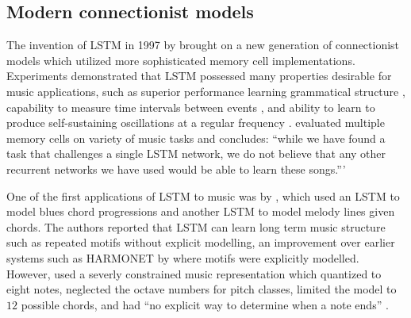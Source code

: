 \subsection{Modern connectionist models}

The invention of LSTM in 1997 by \citet{hochreiter1997long} brought on a new
generation of connectionist models which utilized more sophisticated memory
cell implementations. Experiments demonstrated that LSTM possessed many
properties desirable for music applications, such as superior performance
learning grammatical structure \citep{gers2001lstm}, capability to measure time
intervals between events \citep{gers2000recurrent}, and ability to learn to
produce self-sustaining oscillations at a regular frequency
\citet{gers2002learning}. \citet{franklin2006recurrent} evaluated multiple
memory cells on variety of music tasks and concludes: ``while we have found a
task that challenges a single LSTM network, we do not believe that any other
recurrent networks we have used would be able to learn these songs.'''

One of the first applications of LSTM to music was by
\citet{Eck2002,Eck2002-blues}, which used an LSTM to model blues chord
progressions and another LSTM to model melody lines given chords. The authors
reported that LSTM can learn long term music structure such as repeated motifs
without explicit modelling, an improvement over earlier systems such as
HARMONET by \citet{feulner1994melonet} where motifs were explicitly modelled. However,
\citet{Eck2002} used a severly constrained music representation which quantized
to eight notes, neglected the octave numbers for pitch classes, limited the
model to $12$ possible chords, and had ``no explicit way to determine when a
note ends'' \citet{Eck2002}.



